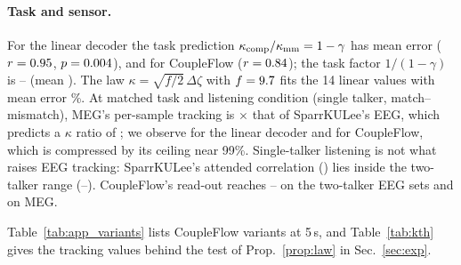 \documentclass[twoside]{article}
\begin{document}
\paragraph{Task and sensor.} For the linear decoder the task prediction
$\kappa_{\rm comp}/\kappa_{\rm mm}=1-\gamma$ has mean error \taskMaeLin{} ($r=0.95$,
$p=0.004$), and for CoupleFlow \taskMaeCF{} ($r=0.84$); the task factor
$1/(1-\gamma)$ is \taskFacMin--\taskFacMax{} (mean \taskFacMean). The law
$\kappa=\sqrt{f/2}\,\Delta\zeta$ with $f=9.7$ fits the 14 linear values with mean error
\thMape\%. At matched task and listening condition (single talker, match--mismatch), MEG's
per-sample tracking is \megRratio$\times$ that of SparrKULee's EEG, which predicts a $\kappa$
ratio of \megDzPred; we observe \megKlinObs{} for the linear decoder and \megKcfObs{} for
CoupleFlow, which is compressed by its ceiling near 99\%. Single-talker listening is not what
raises EEG tracking: SparrKULee's attended correlation (\rSparr) lies inside the two-talker
range (\rTwoMin--\rTwoMax). CoupleFlow's read-out reaches \rCFattMin--\rCFattMax{} on the
two-talker EEG sets and \rCFmeg{} on MEG.

Table~\ref{tab:app_variants} lists CoupleFlow variants at 5\,s, and Table~\ref{tab:kth} gives
the tracking values behind the test of Prop.~\ref{prop:law} in Sec.~\ref{sec:exp}.
\begin{table}[h]\centering\small
\caption{CoupleFlow variants, 5-s accuracy (\%, seed 0). 125\,ms / 0\,ms: start of the neural
lag window. env.\ only: broadband envelope without sub-band features (Fuglsang'20 and
Broderick are envelope-only in every column). rank 8: larger per-listener correction.
listener FT: per-listener fine-tuning after pooled training. native ch.: all native channels
instead of the 64 canonical ones (125-ms window). n/a: the variant equals the base
(envelope-only releases; caps with 64 EEG channels). ``--'': not run. Rank 8 and listener FT
were run only on KU Leuven, DTU and ESAA, to test whether listener heterogeneity explained
the ESAA gap; neither did. MEG-MASC uses its 208 sensors throughout (208-channel input
layer).}\label{tab:app_variants}

\end{table}
\begin{table}[h]\centering\small
\caption{Test of Prop.~\ref{prop:law}: tracking of the attended ($r_{\rm att}$) and
competing ($r_{\rm comp}$) envelope by the per-listener linear decoder (all listeners),
ignored-talker ratio $\gamma$, the predicted and the observed ratio of competing to
match--mismatch $\kappa$.}\label{tab:kth}

\end{table}
\end{document}

